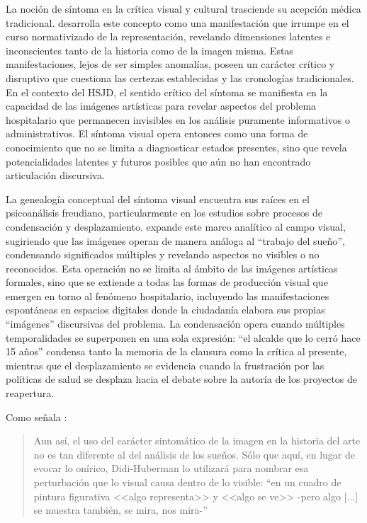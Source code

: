 La noción de síntoma en la crítica visual y cultural trasciende su acepción médica tradicional. \parencite{DidiHuberman2011} desarrolla este concepto como una manifestación que irrumpe en el curso \textcolor{edit30sept}{normativizado} de la representación, revelando dimensiones latentes e inconscientes tanto de la historia como de la imagen misma. Estas manifestaciones, lejos de ser simples anomalías, poseen un carácter crítico y disruptivo que cuestiona las certezas establecidas y las cronologías tradicionales. En el contexto del HSJD, el sentido crítico del síntoma se manifiesta en la capacidad de las imágenes artísticas para revelar aspectos del problema hospitalario que permanecen invisibles en los análisis puramente informativos o administrativos. El síntoma visual opera entonces como una forma de conocimiento que no se limita a diagnosticar estados presentes, sino que revela potencialidades latentes y futuros posibles que aún no han encontrado articulación discursiva.

La genealogía conceptual del síntoma visual encuentra sus raíces en el psicoanálisis freudiano, particularmente en los estudios sobre procesos de condensación y desplazamiento. \parencite{DidiHuberman2011} expande este marco analítico al campo visual, sugiriendo que las imágenes operan de manera análoga al ``trabajo del sueño'', condensando significados múltiples y revelando aspectos no visibles o no reconocidos. Esta operación no se limita al ámbito de las imágenes artísticas formales, sino que se extiende a todas las formas de producción visual que emergen en torno al fenómeno hospitalario, incluyendo las manifestaciones espontáneas en espacios digitales donde la ciudadanía elabora sus propias ``imágenes'' discursivas del problema. La condensación opera cuando múltiples temporalidades se superponen en una sola expresión: ``el alcalde que lo cerró hace 15 años'' condensa tanto la memoria de la clausura como la crítica al presente, mientras que el desplazamiento se evidencia cuando la frustración por las políticas de salud se desplaza hacia el debate sobre la autoría de los proyectos de reapertura.

Como señala \parencite[p. 37]{VegaArevalo2017}:

\begin{quote}
    Aun así, el uso del carácter sintomático de la imagen en la historia del arte no es tan diferente al del análisis de los sueños. Sólo que aquí, en lugar de evocar lo onírico, Didi-Huberman lo utilizará para nombrar esa perturbación que lo visual causa dentro de lo visible: ``en un cuadro de pintura figurativa <<algo representa>> y <<algo se ve>> -pero algo [...] se muestra también, se mira, nos mira-''
\end{quote}

